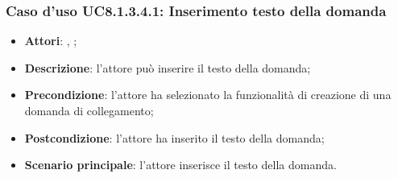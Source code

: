 	\subsubsection{Caso d'uso UC8.1.3.4.1: Inserimento testo della domanda}
	\label{UC8.1.3.4.1}
	\begin{itemize}
		\item
		\textbf{Attori}: \uau, \uaupro;
		\item		
		\textbf{Descrizione}: l'attore può inserire il testo della domanda;
		\item
		\textbf{Precondizione}: l'attore ha selezionato la funzionalità di creazione di una domanda di collegamento;
		\item \textbf{Postcondizione}: l'attore ha inserito il testo della domanda;
		\item \textbf{Scenario principale}: l'attore inserisce il testo della domanda. 
	\end{itemize}


